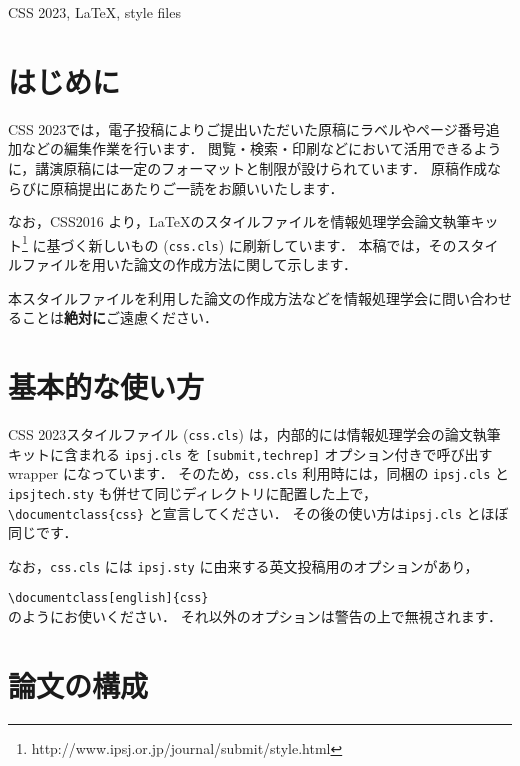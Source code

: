 \documentclass{css}
\def\|{\verb|}
\newcommand{\cssname}[0]{CSS 2023}
\begin{document}
\begin{ekeyword}
\cssname, \LaTeX, style files
\end{ekeyword}

%% if you use english opsion, you should put your English abstract in the abstract environment.
%% eabstract is not displayed in english mode.

\maketitle

%1
\section{はじめに}

\cssname では，電子投稿によりご提出いただいた原稿にラベルやページ番号追加などの編集作業を行います．
閲覧・検索・印刷などにおいて活用できるように，講演原稿には一定のフォーマットと制限が設けられています．
原稿作成ならびに原稿提出にあたりご一読をお願いいたします．

なお，CSS2016 より，\LaTeX のスタイルファイルを情報処理学会論文執筆キット\footnote{http://www.ipsj.or.jp/journal/submit/style.html} に基づく新しいもの (\|css.cls|) に刷新しています．
本稿では，そのスタイルファイルを用いた論文の作成方法に関して示します．

本スタイルファイルを利用した論文の作成方法などを情報処理学会に問い合わせることは\textbf{絶対に}ご遠慮ください．

\section{基本的な使い方}

\cssname スタイルファイル (\|css.cls|) は，内部的には情報処理学会の論文執筆キットに含まれる \|ipsj.cls| を \|[submit,techrep]| オプション付きで呼び出す wrapper になっています．
そのため，\|css.cls| 利用時には，同梱の \|ipsj.cls| と \|ipsjtech.sty| も併せて同じディレクトリに配置した上で，\|\documentclass{css}| と宣言してください．
その後の使い方は\|ipsj.cls| とほぼ同じです．

なお，\|css.cls| には \|ipsj.sty| に由来する英文投稿用のオプションがあり，

\noindent
\|\documentclass[english]{css} |\\
のようにお使いください．
それ以外のオプションは警告の上で無視されます．

\section{論文の構成}
\end{document}
